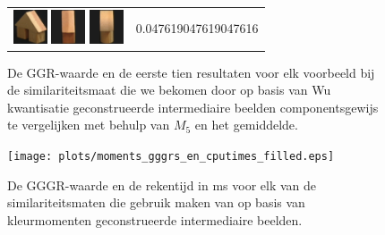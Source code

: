 {\begin{figure}[p]
\begin{tabular}{m{11cm} | m{3cm} |}
\includegraphics[width=1cm]{coil/beeld-46.eps}
\includegraphics[width=1cm]{coil/beeld-44.eps}
\includegraphics[width=1cm]{coil/beeld-2.eps}
& {\scriptsize 0.047619047619047616}
\\
\end{tabular}
\vspace{5pt}
\caption{\label{fig:results_beste_dom_colors}De GGR-waarde en de eerste tien resultaten voor elk 
voorbeeld bij de similariteitsmaat die we bekomen door op basis van Wu 
kwantisatie geconstrueerde intermediaire beelden componentsgewijs te vergelijken met behulp van 
$M_5$ en het gemiddelde.}
\end{figure}

\clearpage

\begin{figure}[p]
\centering
\texttt{[image: plots/moments\_gggrs\_en\_cputimes\_filled.eps]}
\vspace{1pt}
\caption{\label{fig:moments_gggrs_en_cputimes}De GGGR-waarde en de rekentijd in ms
voor elk van de similariteitsmaten die gebruik maken
van op basis van kleurmomenten geconstrueerde intermediaire beelden.}
\end{figure}

}
